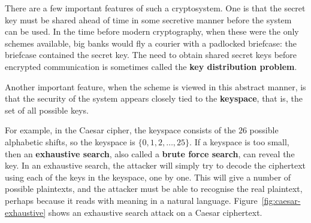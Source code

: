 \documentclass{article}
\theoremstyle{plain}
\theoremstyle{definition}
\theoremstyle{remark}
\numberwithin{theorem}{section}
\begin{document}
There are a few important features of such a cryptosystem.  One is that the secret key must be shared ahead of time in some secretive manner before the system can be used.  In the time before modern cryptography, when these were the only schemes available, big banks would fly a courier with a padlocked briefcase:  the briefcase contained the secret key.  The need to obtain shared secret keys before encrypted communication is sometimes called the \textbf{key distribution problem}.

Another important feature, when the scheme is viewed in this abstract manner, is that the security of the system appears closely tied to the \textbf{keyspace}, that is, the set of all possible keys.

For example, in the Caesar cipher, the keyspace consists of the $26$ possible alphabetic shifts, so the keyspace is $\{ 0, 1, 2, \ldots, 25 \}$.  If a keyspace is too small, then an \textbf{exhaustive search}, also called a \textbf{brute force search}, can reveal the key.  In an exhaustive search, the attacker will simply try to decode the ciphertext using each of the keys in the keyspace, one by one.  This will give a number of possible plaintexts, and the attacker must be able to recognise the real plaintext, perhaps because it reads with meaning in a natural language.  Figure~\ref{fig:caesar-exhaustive} shows an exhaustive search attack on a Caesar ciphertext.
\end{document}
